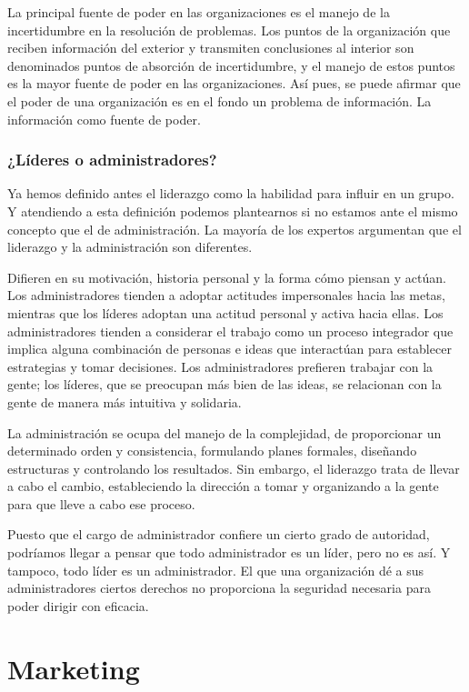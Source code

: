 \documentclass[
]{krantz}
\begin{document}
La principal fuente de poder en las organizaciones es el manejo de la incertidumbre en la resolución de problemas. Los puntos de la organización que reciben información del exterior y transmiten conclusiones al interior son denominados puntos de absorción de incertidumbre, y el manejo de estos puntos es la mayor fuente de poder en las organizaciones. Así pues, se puede afirmar que el poder de una organización es en el fondo un problema de información. La información como fuente de poder.

\hypertarget{luxedderes-o-administradores}{%
\subsection{¿Líderes o administradores?}\label{luxedderes-o-administradores}}

Ya hemos definido antes el liderazgo como la habilidad para influir en un grupo. Y atendiendo a esta definición podemos plantearnos si no estamos ante el mismo concepto que el de administración. La mayoría de los expertos argumentan que el liderazgo y la administración son diferentes.

Difieren en su motivación, historia personal y la forma cómo piensan y actúan. Los administradores tienden a adoptar actitudes impersonales hacia las metas, mientras que los líderes adoptan una actitud personal y activa hacia ellas. Los administradores tienden a considerar el trabajo como un proceso integrador que implica alguna combinación de personas e ideas que interactúan para establecer estrategias y tomar decisiones. Los administradores prefieren trabajar con la gente; los líderes, que se preocupan más bien de las ideas, se relacionan con la gente de manera más intuitiva y solidaria.

La administración se ocupa del manejo de la complejidad, de proporcionar un determinado orden y consistencia, formulando planes formales, diseñando estructuras y controlando los resultados. Sin embargo, el liderazgo trata de llevar a cabo el cambio, estableciendo la dirección a tomar y organizando a la gente para que lleve a cabo ese proceso.

Puesto que el cargo de administrador confiere un cierto grado de autoridad, podríamos llegar a pensar que todo administrador es un líder, pero no es así. Y tampoco, todo líder es un administrador. El que una organización dé a sus administradores ciertos derechos no proporciona la seguridad necesaria para poder dirigir con eficacia.

\hypertarget{marketing}{%
\chapter{Marketing}\label{marketing}}
\end{document}
